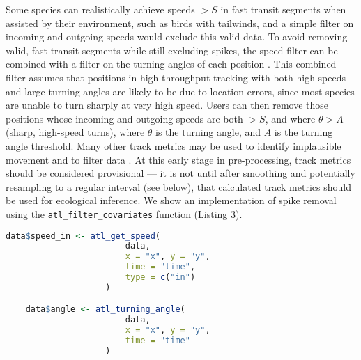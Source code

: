 \begin{refsection}
    Some species can realistically achieve speeds $> S$ in fast transit segments when assisted by their environment, such as birds with tailwinds, and a simple filter on incoming and outgoing speeds would exclude this valid data.
    To avoid removing valid, fast transit segments while still excluding spikes, the speed filter can be combined with a filter on the turning angles of each position \citep[see][]{bjorneraas2010, calenge2009}.
    This combined filter assumes that positions in high-throughput tracking with both high speeds and large turning angles are likely to be due to location errors, since most species are unable to turn sharply at very high speed.
    Users can then remove those positions whose incoming and outgoing speeds are both $> S$, and where $\theta > A$ (sharp, high-speed turns), where $\theta$ is the turning angle, and $A$ is the turning angle threshold.
    Many other track metrics may be used to identify implausible movement and to filter data \citep{seidel2018}.
    At this early stage in pre-processing, track metrics should be considered provisional --- it is not until after smoothing and potentially resampling to a regular interval (see below), that calculated track metrics should be used for ecological inference.
    We show an implementation of spike removal using the \texttt{atl\_filter\_covariates} function (Listing 3).

    \begin{lstlisting}[float, language=R, style=customR, caption = {
        Filtering a movement track on incoming and outgoing speeds, and on turning angle to remove unrealistic movement.
        The functions \texttt{atl\_get\_speed} and \texttt{atl\_turning\_angle} are used to get the speeds and turning angles before filtering, and assigned to a column in the data (assignment of \texttt{speed\_out} is not shown).
        The filter step only retains positions with speeds below the speed threshold $S$ \textit{or} angles above the turning angle threshold $\theta$, i.e., positions where the animal is slow but makes sharp turns, and data where the animal moves quickly in a relatively straight line.}]
    data$speed_in <- atl_get_speed(
                        data,
                        x = "x", y = "y",
                        time = "time", 
                        type = c("in")
                    )

    data$angle <- atl_turning_angle(
                        data,
                        x = "x", y = "y", 
                        time = "time"
                    )


\end{lstlisting}
\end{refsection}
